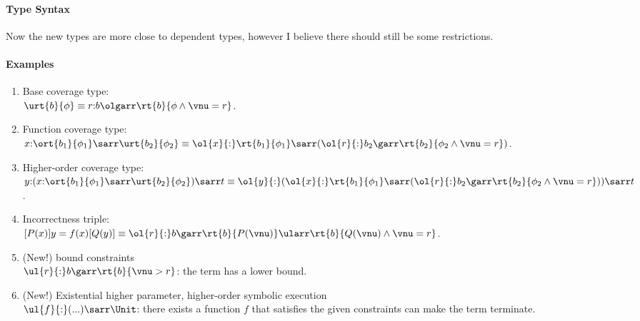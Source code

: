 \paragraph{Type Syntax} Now the new types are more close to dependent types, however I believe there should still be some restrictions.

\paragraph{Examples}
\begin{enumerate}
    \item Base coverage type: \\
    $\urt{b}{\phi} \equiv r{:}b\olgarr \rt{b}{\phi \land \vnu = r}$.
    \item Function coverage type: \\
    $x{:}\ort{b_1}{\phi_1}\sarr\urt{b_2}{\phi_2} \equiv \ol{x}{:}\rt{b_1}{\phi_1}\sarr(\ol{r}{:}b_2\garr\rt{b_2}{\phi_2 \land \vnu = r})$.
    \item Higher-order coverage type: \\
    $y{:}(x{:}\ort{b_1}{\phi_1}\sarr\urt{b_2}{\phi_2})\sarr t \equiv \ol{y}{:}(\ol{x}{:}\rt{b_1}{\phi_1}\sarr(\ol{r}{:}b_2\garr\rt{b_2}{\phi_2 \land \vnu = r})) \sarr t$.
    \item Incorrectness triple: \\
    $[P(x)] y = f(x) [Q(y)] \equiv \ol{r}{:}b\garr \rt{b}{P(\vnu)} \ularr \rt{b}{Q(\vnu) \land \vnu = r}$. 
    \item (New!) bound constraints \\
    $\ul{r}{:}b\garr\rt{b}{\vnu > r}$: the term has a lower bound.
    \item (New!) Existential higher parameter, higher-order symbolic execution \\
    $\ul{f}{:}( ...) \sarr \Unit $: there exists a function $f$ that satisfies the given constraints can make the term terminate.
\end{enumerate} 

